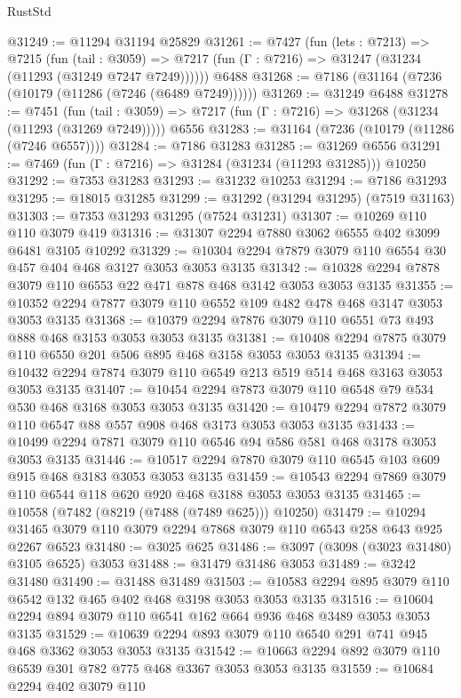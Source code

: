 \begin{lexlean}{RustStd}
\begin{coremodule}
@31249 := @11294 @31194 @25829
@31261 := @7427
    (fun (lets : @7213) =>
    @7215
      (fun (tail : @3059) =>
      @7217 (fun (Γ : @7216) => @31247 (@31234 (@11293 (@31249 @7247 @7249))))))
    @6488
@31268 := @7186 (@31164 (@7236 (@10179 (@11286 (@7246 (@6489 @7249))))))
@31269 := @31249 @6488
@31278 := @7451
    (fun (tail : @3059) => @7217 (fun (Γ : @7216) => @31268 (@31234 (@11293 (@31269 @7249)))))
    @6556
@31283 := @31164 (@7236 (@10179 (@11286 (@7246 @6557))))
@31284 := @7186 @31283
@31285 := @31269 @6556
@31291 := @7469 (fun (Γ : @7216) => @31284 (@31234 (@11293 @31285))) @10250
@31292 := @7353 @31283
@31293 := @31232 @10253
@31294 := @7186 @31293
@31295 := @18015 @31285
@31299 := @31292 (@31294 @31295) (@7519 @31163)
@31303 := @7353 @31293 @31295 (@7524 @31231)
@31307 := @10269 @110 @110 @3079 @419
@31316 := @31307 @2294 @7880 @3062 @6555 @402 @3099 @6481 @3105 @10292
@31329 := @10304 @2294 @7879 @3079 @110 @6554 @30 @457 @404 @468 @3127 @3053 @3053 @3135
@31342 := @10328 @2294 @7878 @3079 @110 @6553 @22 @471 @878 @468 @3142 @3053 @3053 @3135
@31355 := @10352 @2294 @7877 @3079 @110 @6552 @109 @482 @478 @468 @3147 @3053 @3053 @3135
@31368 := @10379 @2294 @7876 @3079 @110 @6551 @73 @493 @888 @468 @3153 @3053 @3053 @3135
@31381 := @10408 @2294 @7875 @3079 @110 @6550 @201 @506 @895 @468 @3158 @3053 @3053 @3135
@31394 := @10432 @2294 @7874 @3079 @110 @6549 @213 @519 @514 @468 @3163 @3053 @3053 @3135
@31407 := @10454 @2294 @7873 @3079 @110 @6548 @79 @534 @530 @468 @3168 @3053 @3053 @3135
@31420 := @10479 @2294 @7872 @3079 @110 @6547 @88 @557 @908 @468 @3173 @3053 @3053 @3135
@31433 := @10499 @2294 @7871 @3079 @110 @6546 @94 @586 @581 @468 @3178 @3053 @3053 @3135
@31446 := @10517 @2294 @7870 @3079 @110 @6545 @103 @609 @915 @468 @3183 @3053 @3053 @3135
@31459 := @10543 @2294 @7869 @3079 @110 @6544 @118 @620 @920 @468 @3188 @3053 @3053 @3135
@31465 := @10558 (@7482 (@8219 (@7488 (@7489 @625))) @10250)
@31479 := @10294 @31465 @3079 @110 @3079 @2294 @7868 @3079 @110 @6543 @258 @643 @925 @2267 @6523
@31480 := @3025 @625
@31486 := @3097 (@3098 (@3023 @31480) @3105 @6525) @3053
@31488 := @31479 @31486 @3053
@31489 := @3242 @31480
@31490 := @31488 @31489
@31503 := @10583 @2294 @895 @3079 @110 @6542 @132 @465 @402 @468 @3198 @3053 @3053 @3135
@31516 := @10604 @2294 @894 @3079 @110 @6541 @162 @664 @936 @468 @3489 @3053 @3053 @3135
@31529 := @10639 @2294 @893 @3079 @110 @6540 @291 @741 @945 @468 @3362 @3053 @3053 @3135
@31542 := @10663 @2294 @892 @3079 @110 @6539 @301 @782 @775 @468 @3367 @3053 @3053 @3135
@31559 := @10684
    @2294
    @402
    @3079
    @110

\end{coremodule}
\end{lexlean}
